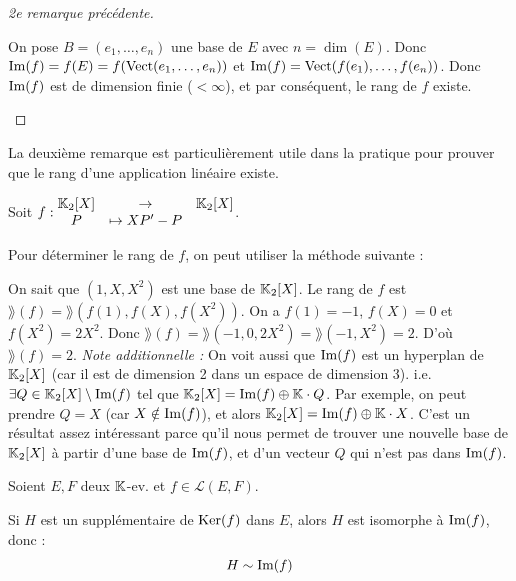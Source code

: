 \documentclass[12pt, a4paper]{report}
\begin{document}
\begin{proof}[2e remarque précédente]
    \begin{outline}
        \1 On pose $B = (e_1,\dots,e_n)$ une base de $E$ avec $n = \dim(E)$.
        \1 Donc $\mathrm{Im}(f) = f(E) = f(\mathrm{Vect}(e_1,\dots,e_n))$ et $\mathrm{Im}(f) = \mathrm{Vect}(f(e_1),\dots,f(e_n))$.
        \1 Donc $\mathrm{Im}(f)$ est de dimension finie ($< \infty$), et par conséquent, le rang de $f$ existe.
    \end{outline}
\end{proof}

\begin{methodbox}
    La deuxième remarque est particulièrement utile dans la pratique pour prouver que le rang d'une application linéaire existe.
\end{methodbox}

\begin{example}
    Soit $f : \begin{matrix}
    \mathbb{K}_2[X] &\to &\mathbb{K}_2[X]\\
    P &\mapsto XP' - P
    \end{matrix}$.

    Pour déterminer le rang de $f$, on peut utiliser la méthode suivante :
    \begin{outline}
        \1 On sait que $(1,X,X^2)$ est une base de $\mathbb{K}_2[X]$.
        \1 Le rang de $f$ est $\rang(f) = \rang(f(1),f(X),f(X^2))$.
        \1 On a $f(1) = -1$, $f(X) = 0$ et $f(X^2) = 2X^2$.
        \1 Donc $\rang(f) = \rang(-1,0,2X^2) = \rang(-1,X^2) = 2$.
        \1 D'où $\rang(f) = 2$.
        \1 \textit{Note additionnelle :}
        \2 On voit aussi que $\mathrm{Im}(f)$ est un hyperplan de $\mathbb{K}_2[X]$ (car il est de dimension 2 dans un espace de dimension 3).
        \2 i.e. $\exists Q \in \mathbb{K}_2[X]\setminus\mathrm{Im}(f)$ tel que $\mathbb{K}_2[X] = \mathrm{Im}(f) \oplus \mathbb{K}\cdot Q$.
        \2 Par exemple, on peut prendre $Q = X$ (car $X \notin \mathrm{Im}(f)$), et alors $\mathbb{K}_2[X] = \mathrm{Im}(f) \oplus \mathbb{K}\cdot X$.
        \2 C'est un résultat assez intéressant parce qu'il nous permet de trouver une nouvelle base de $\mathbb{K}_2[X]$ à partir d'une base de $\mathrm{Im}(f)$, et d'un vecteur $Q$ qui n'est pas dans $\mathrm{Im}(f)$.
    \end{outline}
\end{example}

\begin{property}
    Soient $E,F$ deux $\mathbb{K}$-ev. et $f \in \mathcal L(E,F)$.

    Si $H$ est un supplémentaire de $\mathrm{Ker}(f)$ dans $E$, alors $H$ est isomorphe à $\mathrm{Im}(f)$, donc :
    $$H \sim \mathrm{Im}(f)$$
\end{property}
\end{document}
